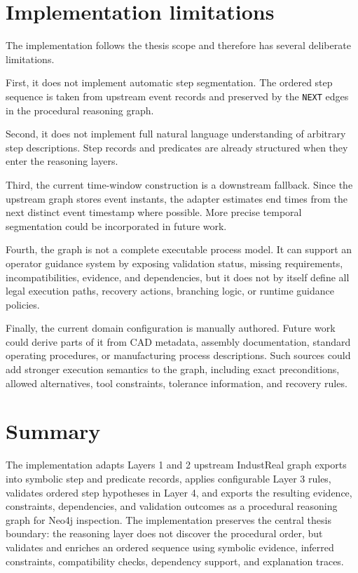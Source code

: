 \section{Implementation limitations}
\label{sec:implementation-limitations}

The implementation follows the thesis scope and therefore has several deliberate limitations.

First, it does not implement automatic step segmentation. The ordered step sequence is taken from upstream event records and preserved by the \texttt{NEXT} edges in the procedural reasoning graph.

Second, it does not implement full natural language understanding of arbitrary step descriptions. Step records and predicates are already structured when they enter the reasoning layers.

Third, the current time-window construction is a downstream fallback. Since the upstream graph stores event instants, the adapter estimates end times from the next distinct event timestamp where possible. More precise temporal segmentation could be incorporated in future work.

Fourth, the graph is not a complete executable process model. It can support an operator guidance system by exposing validation status, missing requirements, incompatibilities, evidence, and dependencies, but it does not by itself define all legal execution paths, recovery actions, branching logic, or runtime guidance policies.

Finally, the current domain configuration is manually authored. Future work could derive parts of it from CAD metadata, assembly documentation, standard operating procedures, or manufacturing process descriptions. Such sources could add stronger execution semantics to the graph, including exact preconditions, allowed alternatives, tool constraints, tolerance information, and recovery rules.

\section{Summary}
\label{sec:implementation-summary}

The implementation adapts Layers 1 and 2 upstream IndustReal graph exports into symbolic step and predicate records, applies configurable Layer 3 rules, validates ordered step hypotheses in Layer 4, and exports the resulting evidence, constraints, dependencies, and validation outcomes as a procedural reasoning graph for Neo4j inspection. The implementation preserves the central thesis boundary: the reasoning layer does not discover the procedural order, but validates and enriches an ordered sequence using symbolic evidence, inferred constraints, compatibility checks, dependency support, and explanation traces.

